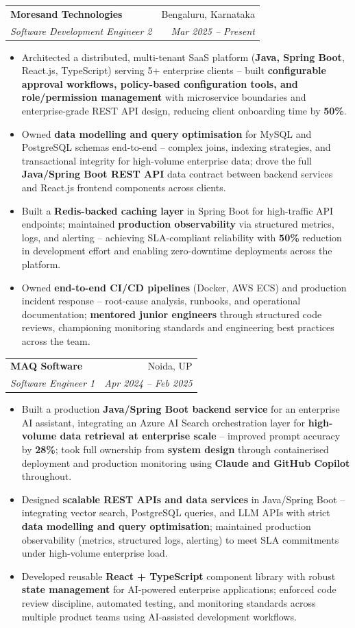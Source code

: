 \documentclass[a4paper,20pt]{article}
\makeatletter
\newcommand{\resumeSubheading}[4]{\vspace{-1pt}\item\begin{tabular*}{0.97\textwidth}{l@{\extracolsep{\fill}}r}\textbf{#1} & #2 \\\textit{#3} & \textit{#4} \\\end{tabular*}\vspace{-5pt}}
\newcommand{\resumeItemListStart}{\begin{itemize}}
\newcommand{\resumeItemListEnd}{\end{itemize}\vspace{-5pt}}
\makeatother
\begin{document}
    \resumeSubheading
      {Moresand Technologies}{Bengaluru, Karnataka}
      {Software Development Engineer 2}{Mar 2025 -- Present}
      \resumeItemListStart
        \item\small{Architected a distributed, multi-tenant SaaS platform (\textbf{Java, Spring Boot}, React.js, TypeScript) serving 5+ enterprise clients -- built \textbf{configurable approval workflows, policy-based configuration tools, and role/permission management} with microservice boundaries and enterprise-grade REST API design, reducing client onboarding time by \textbf{50\%}.}
        \item\small{Owned \textbf{data modelling and query optimisation} for MySQL and PostgreSQL schemas end-to-end -- complex joins, indexing strategies, and transactional integrity for high-volume enterprise data; drove the full \textbf{Java/Spring Boot REST API} data contract between backend services and React.js frontend components across clients.}
        \item\small{Built a \textbf{Redis-backed caching layer} in Spring Boot for high-traffic API endpoints; maintained \textbf{production observability} via structured metrics, logs, and alerting -- achieving SLA-compliant reliability with \textbf{50\%} reduction in development effort and enabling zero-downtime deployments across the platform.}
        \item\small{Owned \textbf{end-to-end CI/CD pipelines} (Docker, AWS ECS) and production incident response -- root-cause analysis, runbooks, and operational documentation; \textbf{mentored junior engineers} through structured code reviews, championing monitoring standards and engineering best practices across the team.}
      \resumeItemListEnd

    \resumeSubheading
      {MAQ Software}{Noida, UP}
      {Software Engineer 1}{Apr 2024 -- Feb 2025}
      \resumeItemListStart
        \item\small{Built a production \textbf{Java/Spring Boot backend service} for an enterprise AI assistant, integrating an Azure AI Search orchestration layer for \textbf{high-volume data retrieval at enterprise scale} -- improved prompt accuracy by \textbf{28\%}; took full ownership from \textbf{system design} through containerised deployment and production monitoring using \textbf{Claude and GitHub Copilot} throughout.}
        \item\small{Designed \textbf{scalable REST APIs and data services} in Java/Spring Boot -- integrating vector search, PostgreSQL queries, and LLM APIs with strict \textbf{data modelling and query optimisation}; maintained production observability (metrics, structured logs, alerting) to meet SLA commitments under high-volume enterprise load.}
        \item\small{Developed reusable \textbf{React + TypeScript} component library with robust \textbf{state management} for AI-powered enterprise applications; enforced code review discipline, automated testing, and monitoring standards across multiple product teams using AI-assisted development workflows.}
      \resumeItemListEnd
\end{document}
